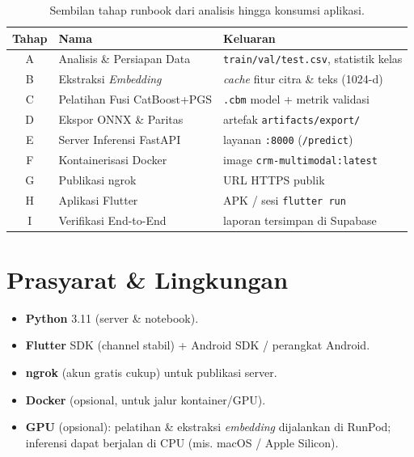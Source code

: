 \documentclass[11pt,a4paper]{article}
\newcommand{\code}[1]{\texttt{\small #1}}
\begin{document}
\begin{table}[h]
\centering
\renewcommand{\arraystretch}{1.25}
\begin{tabular}{@{}clp{8.4cm}@{}}
\toprule
\textbf{Tahap} & \textbf{Nama} & \textbf{Keluaran} \\
\midrule
A & Analisis \& Persiapan Data & \code{train/val/test.csv}, statistik kelas \\
B & Ekstraksi \emph{Embedding} & \emph{cache} fitur citra \& teks (1024-d) \\
C & Pelatihan Fusi CatBoost+PGS & \code{.cbm} model + metrik validasi \\
D & Ekspor ONNX \& Paritas & artefak \code{artifacts/export/} \\
E & Server Inferensi FastAPI & layanan \code{:8000} (\code{/predict}) \\
F & Kontainerisasi Docker & image \code{crm-multimodal:latest} \\
G & Publikasi ngrok & URL HTTPS publik \\
H & Aplikasi Flutter & APK / sesi \code{flutter run} \\
I & Verifikasi End-to-End & laporan tersimpan di Supabase \\
\bottomrule
\end{tabular}
\caption{Sembilan tahap runbook dari analisis hingga konsumsi aplikasi.}
\label{tab:overview}
\end{table}

\section{Prasyarat \& Lingkungan}
\begin{itemize}[leftmargin=1.4em,itemsep=2pt]
  \item \textbf{Python} 3.11 (server \& notebook).
  \item \textbf{Flutter} SDK (channel stabil) + Android SDK / perangkat Android.
  \item \textbf{ngrok} (akun gratis cukup) untuk publikasi server.
  \item \textbf{Docker} (opsional, untuk jalur kontainer/GPU).
  \item \textbf{GPU} (opsional): pelatihan \& ekstraksi \emph{embedding} dijalankan di RunPod; inferensi dapat berjalan di CPU (mis. macOS / Apple Silicon).
\end{itemize}
\end{document}
